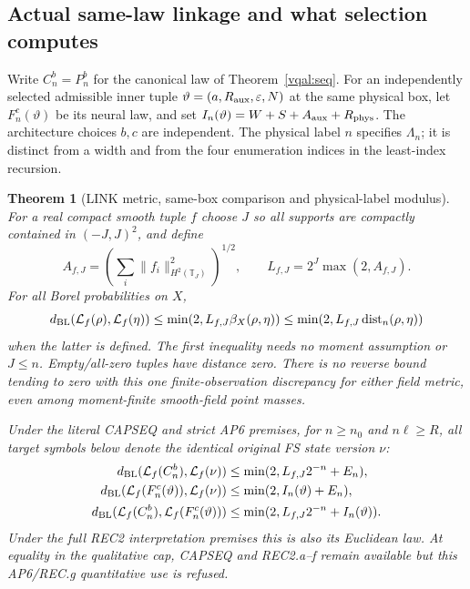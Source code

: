\documentclass[11pt]{article}
\theoremstyle{plain}
\newtheorem{theorem}{Theorem}[section]
\theoremstyle{definition}
\theoremstyle{remark}
\newcommand{\T}{\mathbb{T}}
\begin{document}
\subsection{Actual same-law linkage and what selection computes}
\label{vqal:linkage}

Write $C_n^b=P_n^b$ for the canonical law of
Theorem~\ref{vqal:seq}. For an independently selected admissible inner
tuple $\vartheta=(a,R_{\rm aux},\varepsilon,N)$ at the same physical
box, let $F_n^c(\vartheta)$ be its neural law, and set
$I_n(\vartheta)=W+S+A_{\rm aux}+R_{\rm phys}$.
The architecture choices $b,c$ are independent. The physical label $n$
specifies $\Lambda_n$; it is distinct from a width and from the four
enumeration indices in the least-index recursion.

\begin{theorem}[LINK metric, same-box comparison and physical-label modulus]
\label{vqal:link}
For a real compact smooth tuple $f$ choose $J$ so all supports are
compactly contained in $(-J,J)^2$, and define
\begin{equation}\label{vqal:L}
 A_{f,J}=\left(\sum_i\|f_i\|_{H^2(\T_J)}^2\right)^{1/2},\qquad
 L_{f,J}=2^J\max(2,A_{f,J}).
\end{equation}
For all Borel probabilities on $X$,
\begin{equation}\label{vqal:pushforward}
 d_{\rm BL}(\mathcal L_f(\rho),\mathcal L_f(\eta))
       \le\min(2,L_{f,J}\beta_X(\rho,\eta))
       \le\min(2,L_{f,J}\operatorname{dist}_n(\rho,\eta))
\end{equation}
when the latter is defined. The first inequality needs no moment
assumption or $J\le n$. Empty/all-zero tuples have distance zero.
There is no reverse bound tending to zero with this one finite-observation
discrepancy for either field metric, even among moment-finite smooth-field
point masses.

Under the literal CAPSEQ and strict AP6 premises, for $n\ge n_0$ and
$n\ell\ge R$, all target symbols below denote the identical original
FS state version $\nu$:
\begin{align}\label{vqal:linkbounds}
 d_{\rm BL}(\mathcal L_f(C_n^b),\mathcal L_f(\nu))
       &\le\min(2,L_{f,J}2^{-n}+E_n),\nonumber\\
 d_{\rm BL}(\mathcal L_f(F_n^c(\vartheta)),\mathcal L_f(\nu))
       &\le\min(2,I_n(\vartheta)+E_n),\nonumber\\
 d_{\rm BL}(\mathcal L_f(C_n^b),\mathcal L_f(F_n^c(\vartheta)))
       &\le\min(2,L_{f,J}2^{-n}+I_n(\vartheta)).
\end{align}
Under the full REC2 interpretation premises this is also its Euclidean
law. At equality in the qualitative cap, CAPSEQ and REC2.a--f remain
available but this AP6/REC.g quantitative use is refused.


\end{theorem}
\end{document}

